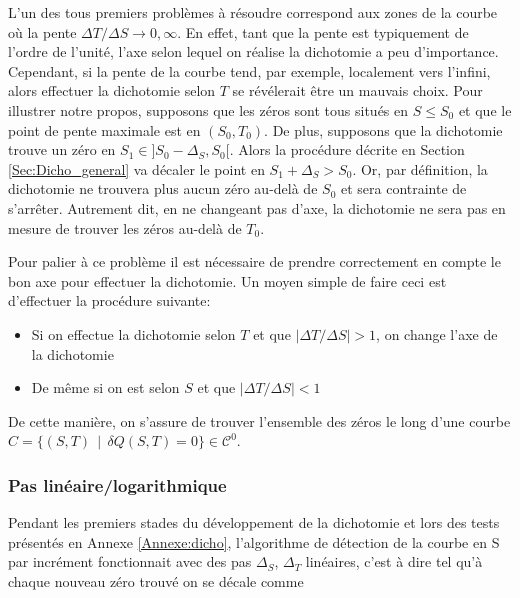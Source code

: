 \documentclass[a4paper,12pt]{article}
\begin{document}
            L'un des tous premiers problèmes à résoudre correspond aux zones de la courbe où la pente $\Delta T / \Delta S \xrightarrow{} 0 , \infty$. En effet, tant que la pente est typiquement de l'ordre de l'unité, l'axe selon lequel on réalise la dichotomie a peu d'importance. Cependant, si la pente de la courbe tend, par exemple, localement vers l'infini, alors effectuer la dichotomie selon $T$ se révélerait être un mauvais choix. \newline
            Pour illustrer notre propos, supposons que les zéros sont tous situés en $S \leq S_0$ et que le point de pente maximale est en $(S_0, T_0)$. De plus, supposons que la dichotomie trouve un zéro en $S_1 \in ]S_0 - \Delta_S , S_0[$. Alors la procédure décrite en Section \ref{Sec:Dicho_general} va décaler le point en $S_1 + \Delta_S > S_0$. Or, par définition, la dichotomie ne trouvera plus aucun zéro au-delà de $S_0$ et sera contrainte de s'arrêter. Autrement dit, en ne changeant pas d'axe, la dichotomie ne sera pas en mesure de trouver les zéros au-delà de $T_0$.\newline
            
            Pour palier à ce problème il est nécessaire de prendre correctement en compte le bon axe pour effectuer la dichotomie. Un moyen simple de faire ceci est d'effectuer la procédure suivante:
    
            \begin{itemize}
                \item Si on effectue la dichotomie selon $T$ et que $\left | \Delta T / \Delta S \right | > 1$, on change l'axe de la dichotomie
                \item De même si on est selon $S$ et que $\left | \Delta T / \Delta S \right | < 1$
            \end{itemize}
        
        De cette manière, on s'assure de trouver l'ensemble des zéros le long d'une courbe \\ ${C = \lbrace (S,T) \ \ | \ \ \delta Q (S,T) = 0 \rbrace \in \mathcal{C}^0}$. 
         
         \subsubsection{Pas linéaire/logarithmique}
            Pendant les premiers stades du développement de la dichotomie et lors des tests présentés en Annexe \ref{Annexe:dicho}, l'algorithme de détection de la courbe en S par incrément fonctionnait avec des pas $\Delta_S$, $\Delta_T$ linéaires, c'est à dire tel qu'à chaque nouveau zéro trouvé on se décale comme
            
\end{document}
